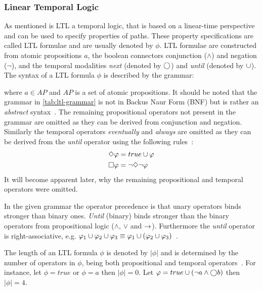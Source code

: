 \subsubsection{Linear Temporal Logic}
\label{sec:ltl}
As mentioned is LTL a temporal logic, that is based on a linear-time perspective and can be used to specify properties of paths. These property specifications are called LTL formulae and are usually denoted by $\phi$. LTL formulae are constructed from atomic propositions $a$, the boolean connectors conjunction ($\land$) and negation ($\lnot$), and the temporal modalities \emph{next} (denoted by $\bigcirc$) and \emph{until} (denoted by $\cup$). The syntax of a LTL formula $\phi$ is described by the grammar:

where $a \in AP$ and $AP$ is a set of atomic propositions. It should be noted that the grammar in \autoref{tab:ltl-grammar} is not in Backus Naur Form (BNF) but is rather an \emph{abstract} syntax~\cite{baier2008principles}. The remaining propositional operators not present in the grammar are omitted as they can be derived from conjunction and negation. Similarly the temporal operators \emph{eventually} and \emph{always} are omitted as they can be derived from the \emph{until} operator using the following rules~\cite[p.~232]{baier2008principles}:
\begin{align}
    &\Diamond \varphi = true \cup \varphi \label{eq:eventually} \\
    &\square \varphi = \lnot \Diamond \lnot \varphi \label{eq:always}
\end{align}
It will become apparent later, why the remaining propositional and temporal operators were omitted.

In the given grammar the operator precedence is that unary operators binds stronger than binary ones. \emph{Until} (binary) binds stronger than the binary operators from propositional logic ($\land$, $\lor$ and $\rightarrow$). Furthermore the \emph{until} operator is right-associative, e.g. $\varphi_1 \cup \varphi_2 \cup \varphi_3 \equiv \varphi_1 \cup \left(\varphi_2 \cup \varphi_3\right)$~\cite{baier2008principles}.

The length of an LTL formula $\phi$ is denoted by $| \phi |$ and is determined by the number of operators in $\phi$, being both propositional and temporal operators~\cite{baier2008principles}. For instance, let $\phi= true$ or $\phi= a$ then $| \phi | = 0$. Let $\varphi= true \cup \left( \lnot a \land \bigcirc b \right)$ then $| \phi | = 4$.

